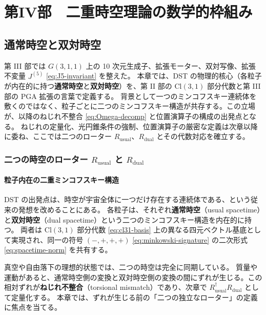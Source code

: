 \documentclass[dvipdfmx,a4paper,oneside]{jsbook}
\numberwithin{equation}{chapter}
\begin{document}
\newpage

\part{第IV部　二重時空理論の数学的枠組み}

\chapter{通常時空と双対時空}

第 III 部では \(G(3,1,1)\) 上の 10 次元生成子、拡張モーター、双対写像、拡張不変量 \(J^{(5)}\) \eqref{eq:J5-invariant} を整えた。
本章では、DST の物理的核心（各粒子が内在的に持つ\textbf{通常時空}と\textbf{双対時空}）を、第 II 部の \(\mathrm{Cl}(3,1)\) 部分代数と第 III 部の PGA 拡張の言葉で定義する。
背景として一つのミンコフスキー連続体を敷くのではなく、粒子ごとに二つのミンコフスキー構造が共存する。この立場が、以降のねじれ不整合 \eqref{eq:Omega-decomp} と位置演算子の構成の出発点となる。
ねじれの定量化、光円錐条件の強制、位置演算子の厳密な定義は次章以降に委ね、ここでは二つのローター \(R_{\mathrm{usual}}\)、\(R_{\mathrm{dual}}\) とその代数対応を確立する。

\section{\texorpdfstring{二つの時空のローター \(R_{\mathrm{usual}}\) と \(R_{\mathrm{dual}}\)}{二つの時空のローター R usual と R dual}}

\subsection{粒子内在の二重ミンコフスキー構造}

DST の出発点は、時空が宇宙全体に一つだけ存在する連続体である、という従来の発想を改めることにある。
各粒子は、それぞれ\textbf{通常時空}（usual spacetime）と\textbf{双対時空}（dual spacetime）という二つのミンコフスキー構造を内在的に持つ。
両者は \(\mathrm{Cl}(3,1)\) 部分代数 \eqref{eq:cl31-basis} 上の異なる四元ベクトル基底として実現され、同一の符号 \((-,+,+,+)\) \eqref{eq:minkowski-signature} の二次形式 \eqref{eq:spacetime-norm} を共有する。

真空や自由落下の理想的状態では、二つの時空は完全に同期している。
質量や運動があると、通常時空側の変換と双対時空側の変換の間にずれが生じる。この相対ずれが\textbf{ねじれ不整合}（torsional mismatch）であり、次章で \(R_{\mathrm{usual}}^\dagger R_{\mathrm{dual}}\) として定量化する。
本章では、ずれが生じる前の「二つの独立なローター」の定義に焦点を当てる。
\end{document}
